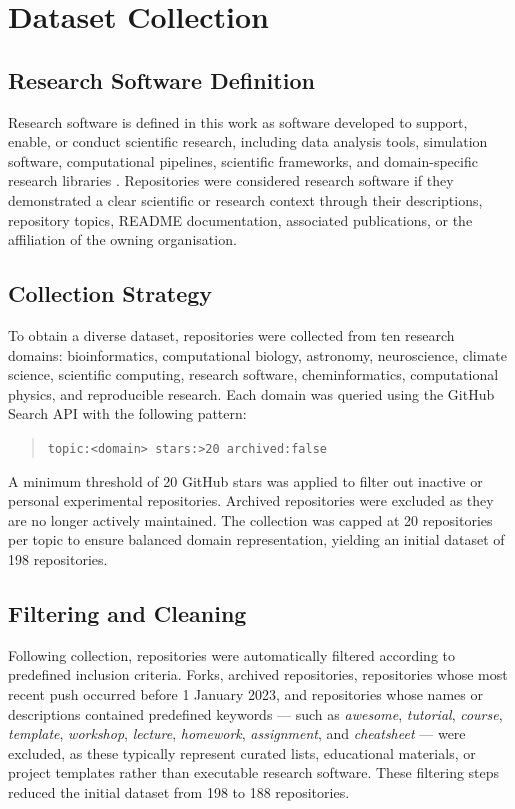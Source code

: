 \section{Dataset Collection}

\subsection{Research Software Definition}

Research software is defined in this work as software developed to 
support, enable, or conduct scientific research, including data 
analysis tools, simulation software, computational pipelines, 
scientific frameworks, and domain-specific research libraries 
\cite{barker2022fair4rs}. Repositories were considered research 
software if they demonstrated a clear scientific or research context 
through their descriptions, repository topics, README documentation, 
associated publications, or the affiliation of the owning organisation.

\subsection{Collection Strategy}

To obtain a diverse dataset, repositories were collected from ten 
research domains: bioinformatics, computational biology, astronomy, 
neuroscience, climate science, scientific computing, research 
software, cheminformatics, computational physics, and reproducible 
research. Each domain was queried using the GitHub Search API with 
the following pattern:

\begin{quote}
\texttt{topic:<domain> stars:>20 archived:false}
\end{quote}

A minimum threshold of 20 GitHub stars was applied to filter out 
inactive or personal experimental repositories. Archived repositories 
were excluded as they are no longer actively maintained. The 
collection was capped at 20 repositories per topic to ensure balanced 
domain representation, yielding an initial dataset of 198 repositories.

\subsection{Filtering and Cleaning}

Following collection, repositories were automatically filtered 
according to predefined inclusion criteria. Forks, archived 
repositories, repositories whose most recent push occurred before 
1 January 2023, and repositories whose names or descriptions 
contained predefined keywords --- such as \textit{awesome}, 
\textit{tutorial}, \textit{course}, \textit{template}, 
\textit{workshop}, \textit{lecture}, \textit{homework}, 
\textit{assignment}, and \textit{cheatsheet} --- were excluded, 
as these typically represent curated lists, educational materials, 
or project templates rather than executable research software. 
These filtering steps reduced the initial dataset from 198 to 
188 repositories.

